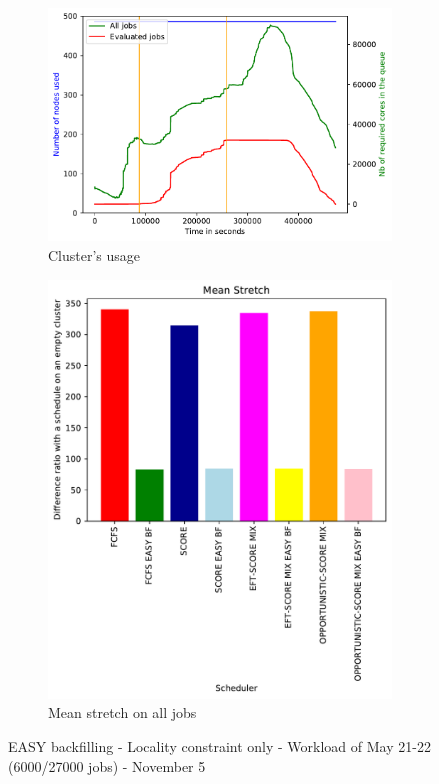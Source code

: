 \documentclass[a4paper]{article}
\begin{document}
\begin{figure}[H]\centering
\begin{subfigure}[b]{0.4\linewidth}\centering\includegraphics[width=1\linewidth]{MBSS/plot/2022-05-21->2022-05-22_V9271_Fcfs_Used_nodes_450_128_32_256_4_1024.pdf}\caption{Cluster's usage}\end{subfigure}
\begin{subfigure}[b]{0.4\linewidth}\centering\includegraphics[width=0.9\linewidth]{MBSS/plot/Results_FCFS_Score_Easy_Backfill_2022-05-21->2022-05-22_V9271_Mean_Stretch_450_128_32_256_4_1024.pdf}\caption{Mean stretch on all jobs}\end{subfigure}
\caption{EASY backfilling - Locality constraint only - Workload of May 21-22 (6000/27000 jobs) - November 5}\end{figure}
\end{document}
